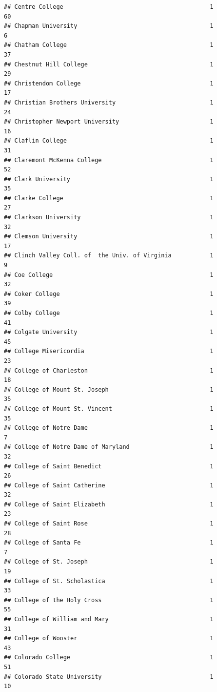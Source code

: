 \documentclass[
]{article}
\begin{document}
\begin{verbatim}
## Centre College                                          1          60
## Chapman University                                      1           6
## Chatham College                                         1          37
## Chestnut Hill College                                   1          29
## Christendom College                                     1          17
## Christian Brothers University                           1          24
## Christopher Newport University                          1          16
## Claflin College                                         1          31
## Claremont McKenna College                               1          52
## Clark University                                        1          35
## Clarke College                                          1          27
## Clarkson University                                     1          32
## Clemson University                                      1          17
## Clinch Valley Coll. of  the Univ. of Virginia           1           9
## Coe College                                             1          32
## Coker College                                           1          39
## Colby College                                           1          41
## Colgate University                                      1          45
## College Misericordia                                    1          23
## College of Charleston                                   1          18
## College of Mount St. Joseph                             1          35
## College of Mount St. Vincent                            1          35
## College of Notre Dame                                   1           7
## College of Notre Dame of Maryland                       1          32
## College of Saint Benedict                               1          26
## College of Saint Catherine                              1          32
## College of Saint Elizabeth                              1          23
## College of Saint Rose                                   1          28
## College of Santa Fe                                     1           7
## College of St. Joseph                                   1          19
## College of St. Scholastica                              1          33
## College of the Holy Cross                               1          55
## College of William and Mary                             1          31
## College of Wooster                                      1          43
## Colorado College                                        1          51
## Colorado State University                               1          10

\end{verbatim}
\end{document}
